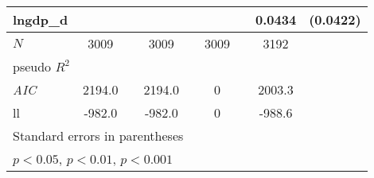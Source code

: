 {\begin{tabular}{l*{4}{cc}}
lngdp\_d   &                  &         &                  &         &                  &         &   0.0434         & (0.0422)\\
\hline
\(N\)     &     3009         &         &     3009         &         &     3009         &         &     3192         &         \\
pseudo \(R^{2}\)&                  &         &                  &         &                  &         &                  &         \\
\textit{AIC}&   2194.0         &         &   2194.0         &         &        0         &         &   2003.3         &         \\
ll        &   -982.0         &         &   -982.0         &         &        0         &         &   -988.6         &         \\
\hline\hline
\multicolumn{9}{l}{\footnotesize Standard errors in parentheses}\\
\multicolumn{9}{l}{\footnotesize \sym{*} \(p<0.05\), \sym{**} \(p<0.01\), \sym{***} \(p<0.001\)}\\
\end{tabular}
}
